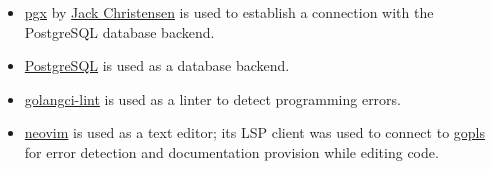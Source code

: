 \begin{itemize}
\item \href{https://github.com/jackc/pgx}{pgx} by
\href{https://jackchristensen.com/}{Jack Christensen} is used
to establish a connection with the PostgreSQL database backend.

\item \href{https://www.postgresql.org/}{PostgreSQL} is used as a
database backend.

\item \href{https://golangci-lint.run/}{golangci-lint} is used as a
linter to detect programming errors.

\item \href{https://neovim.io/}{neovim} is used as a text editor; its
LSP client was used to connect to
\href{https://pkg.go.dev/golang.org/x/tools/gopls}{gopls} for
error detection and documentation provision while editing code.

\end{itemize}



